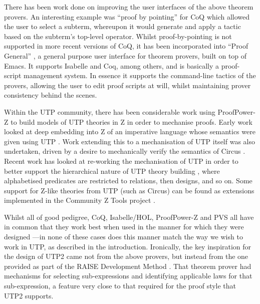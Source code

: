 There has been work done on improving the user interfaces
of the above theorem provers.
An interesting example was ``proof by pointing'' \cite{conf/tacs/BertotKT94}
for CoQ which allowed the user to select a subterm,
whereupon it would generate and apply a tactic based on the subterm's top-level
operator.
Whilst proof-by-pointing is not supported in more recent versions of CoQ,
it has been incorporated into ``Proof General'' \cite{conf/tacas/Aspinall00},
a general purpose user interface for theorem provers, built on top of Emacs.
It supports Isabelle and Coq, among others,
and is basically a proof-script management system.
In essence it supports the command-line tactics of the provers,
allowing the user to edit proof scripts at will,
whilst maintaining prover consistency behind the scenes.

Within the UTP community,
there has been considerable work using Proof{\-}Power-Z to
build models of UTP theories in Z in order to mechanise proofs.
Early work looked at deep embedding into Z of an imperative language whose semantics
were given using UTP \cite{conf/utp/NukaW06}.
Work extending this to a mechanisation of UTP itself was also undertaken,
driven by a desire to mechanically verify the semantics of Circus \cite{journals/fac/OliveiraCW09}.
Recent work has looked at re-working the mechanisation of UTP in order to better support
the hierarchical nature of UTP theory building \cite{journals/entcs/ZeydaC09},
where alphabetised predicates are restricted to relations, then designs, and so on.
Some support for Z-like theories from UTP (such as Circus)
can be found as extensions implemented in the Community Z Tools project
\cite{conf/zum/MalikU05}.


Whilst all of good pedigree, CoQ, Isabelle/HOL, ProofPower-Z and PVS
all have in common that they work best when used in the manner
for which they were designed%
---in none of these cases does this manner match the way
we wish to work in UTP, as described in the introduction.
Ironically, the key inspiration for the design of UTP2 came not from the
above provers, but instead from the one provided as part
of the RAISE Development Method \cite{bk:Raise-dev-mthd:95}.
That theorem prover had mechanisms for selecting sub-expressions
and identifying applicable laws for that sub-expression,
a feature very close to that required for the proof style that UTP2 supports.
